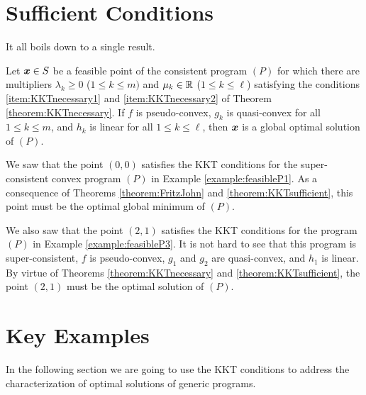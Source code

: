 
\section{Sufficient Conditions}

It all boils down to a single result.

\begin{theorem}\label{theorem:KKTsufficient}
Let $\boldsymbol{x} \in S$ be a feasible point of the consistent program $(P)$ for which there are multipliers $\lambda_k \geq 0$ ($1\leq k \leq m)$ and $\mu_k \in \mathbb{R}$ ($1\leq k \leq \ell$) satisfying the conditions \ref{item:KKTnecessary1} and \ref{item:KKTnecessary2} of Theorem \ref{theorem:KKTnecessary}. If $f$ is pseudo-convex, $g_k$ is quasi-convex for all $1\leq k \leq m$, and $h_k$ is linear for all $1\leq k \leq \ell$, then $\boldsymbol{x}$ is a global optimal solution of $(P)$.
\end{theorem}

\begin{example}
We saw that the point $(0,0)$ satisfies the KKT conditions for the super-consistent convex program $(P)$ in Example \ref{example:feasibleP1}.  As a consequence of Theorems \ref{theorem:FritzJohn} and \ref{theorem:KKTsufficient}, this point must be the optimal global minimum of $(P)$.

We also saw that the point $(2,1)$ satisfies the KKT conditions for the program $(P)$ in Example \ref{example:feasibleP3}.  It is not hard to see that this program is super-consistent, $f$ is pseudo-convex, $g_1$ and $g_2$ are quasi-convex, and $h_1$ is linear.  By virtue of Theorems \ref{theorem:KKTnecessary} and \ref{theorem:KKTsufficient}, the point $(2,1)$ must be the optimal solution of $(P)$.
\end{example}

\section*{Key Examples}
In the following section we are going to use the KKT conditions to address the characterization of optimal solutions of generic programs. 

